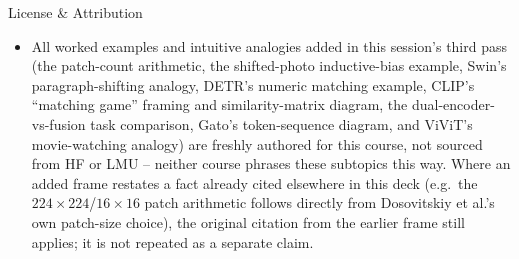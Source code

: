 \begin{vbframe}{License \& Attribution}
\begin{itemize}
\item All worked examples and intuitive analogies added in this session's third pass (the patch-count arithmetic, the shifted-photo inductive-bias example, Swin's paragraph-shifting analogy, DETR's numeric matching example, CLIP's ``matching game'' framing and similarity-matrix diagram, the dual-encoder-vs-fusion task comparison, Gato's token-sequence diagram, and ViViT's movie-watching analogy) are freshly authored for this course, not sourced from HF or LMU -- neither course phrases these subtopics this way. Where an added frame restates a fact already cited elsewhere in this deck (e.g.\ the $224\times224$/$16\times16$ patch arithmetic follows directly from Dosovitskiy et al.'s own patch-size choice), the original citation from the earlier frame still applies; it is not repeated as a separate claim.
\end{itemize}
\end{vbframe}

\endlecture

